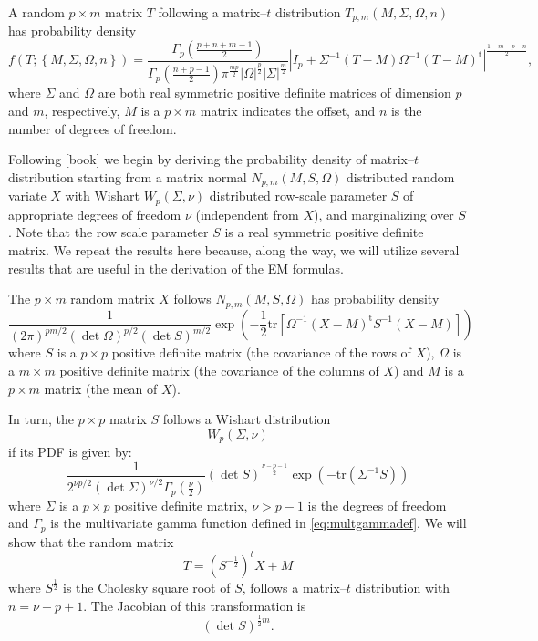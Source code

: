 \documentclass[english,listof=totoc]{scrartcl}
\begin{document}
A random $p\times m$ matrix $T$ following a matrix--$t$ distribution $T_{p,m}(M,\Sigma,\Omega,n)$
has probability density
\begin{equation}
f(T;\left\{M,\Sigma,\Omega,n\right\})=\frac{\Gamma_{p}\left(\frac{p+n+m-1}{2}\right)}{\Gamma_{p}\left(\frac{n+p-1}{2}\right)\pi^{\frac{mp}{2}}|\Omega|^{\frac{p}{2}}|\Sigma|^{\frac{m}{2}}}
|I_p+\Sigma^{-1}(T-M)\Omega^{-1}(T-M)^{\textrm{t}}|^{\frac{1-m-p-n}{2}},
\label{eq:matrixtpdf}
\end{equation}
where $\Sigma$ and $\Omega$ are both real symmetric positive definite matrices of dimension $p$ and $m$, respectively, $M$ is a $p\times m$ matrix indicates the offset, and $n$ is the number of degrees of freedom.

Following {[}book{]} we begin by deriving the probability density of matrix--$t$ distribution starting from a matrix normal $N_{p,m}(M,S,\Omega)$ distributed random variate $X$ with Wishart $W_{p}\left(\Sigma,\nu\right)$ distributed row-scale parameter $S$ of appropriate degrees of freedom $\nu$ (independent from $X$), and marginalizing over $S$. Note that the row scale parameter $S$ is a real symmetric positive definite matrix. We repeat the results here because, along the way, we will utilize several results that are useful in the derivation of the EM formulas.

The $p\times m$ random matrix $X$ follows $N_{p,m}(M,S,\Omega)$ has probability density
\begin{equation}
\frac{1}{(2\pi)^{pm/2}(\det\Omega)^{p/2}(\det S)^{m/2}}\exp\left(-\frac{1}{2}\textrm{tr}\left[\Omega^{-1}(X-M)^{\textrm{t}}S^{-1}(X-M)\right]\right)\label{eq:ndistpdf}
\end{equation}
where $S$ is a $p\times p$ positive definite matrix (the covariance
of the rows of $X$), $\Omega$ is a $m\times m$ positive definite
matrix (the covariance of the columns of $X$) and $M$ is a $p\times m$
matrix (the mean of $X$).

In turn, the $p\times p$ matrix $S$ follows a Wishart distribution
\begin{equation}
W_{p}\left(\Sigma,\nu\right)\label{eq:wdist}
\end{equation}
 if its PDF is given by:
\begin{equation}
\frac{1}{2^{\nu p/2}(\det\Sigma)^{\nu/2}\Gamma_{p}(\frac{\nu}{2})}(\det S)^{\frac{\nu-p-1}{2}}\exp\left(-\textrm{tr}(\Sigma^{-1}S)\right)\label{eq:wdistpdf}
\end{equation}
where $\Sigma$ is a $p\times p$ positive definite matrix, $\nu>p-1$
is the degrees of freedom and $\Gamma_{p}$ is the multivariate gamma
function defined in \ref{eq:multgammadef}. We will show that the
random matrix
\begin{equation}
T=(S^{-\frac{1}{2}})^{t}X+M\label{eq:change}
\end{equation}
where $S^{\frac{1}{2}}$ is the Cholesky square root of $S$, follows
a matrix--$t$ distribution with $n=\nu-p+1$. The Jacobian of this
transformation is 
\begin{equation}
(\det S)^{\frac{1}{2}m}.\label{eq:jac}
\end{equation}
\end{document}
